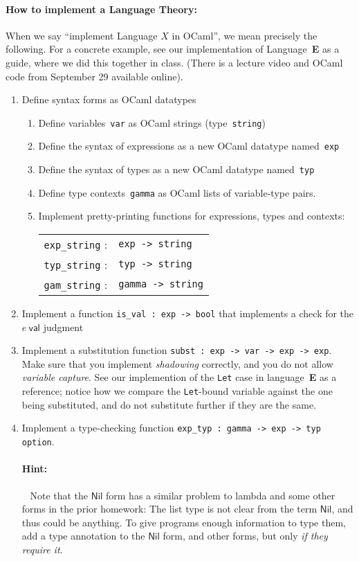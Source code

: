\documentclass[11pt]{article}
\newcommand{\E}{\textbf{\textsf{E}}\xspace}
\newcommand{\Nil}[0]{\textsf{Nil}}
\begin{document}
\paragraph{How to implement a Language Theory:}
When we say ``implement Language $X$ in OCaml'', we mean precisely the
following.  For a concrete example, see our implementation of
Language~\E as a guide, where we did this together in class.  (There
is a lecture video and OCaml code from September 29 available online).
\begin{enumerate}
\item Define syntax forms as OCaml datatypes 
\begin{enumerate}
\item Define variables~\texttt{var} as OCaml strings (type~\texttt{string})
\item Define the syntax of expressions as a new OCaml datatype named~\texttt{exp}
\item Define the syntax of types as a new OCaml datatype named~\texttt{typ}
\item Define type contexts~\texttt{gamma} as OCaml lists of variable-type pairs.
\item Implement pretty-printing functions for expressions, types and contexts:\\ 
\begin{tabular}{ll}
\texttt{exp\_string} :& \texttt{exp -> string}
\\
\texttt{typ\_string} :& \texttt{typ -> string}
\\
\texttt{gam\_string} :& \texttt{gamma -> string}
\end{tabular}
\end{enumerate}
\item Implement a function \texttt{is\_val : exp -> bool} that implements a check for the $e~\textsf{val}$ judgment
\item Implement a substitution function \texttt{subst : exp -> var -> exp -> exp}.  
{
Make sure that you implement \emph{shadowing} correctly, and you do
not allow \emph{variable capture}.  
%
See our implemention of the \texttt{Let} case in language~\E
as a reference; notice how we compare the \texttt{Let}-bound variable
against the one being substituted, and do not substitute further if
they are the same.  }
\item Implement a type-checking function \texttt{exp\_typ : gamma ->
  exp -> typ option}.  

  \paragraph{Hint:}~
  Note that the $\Nil$ form has a similar problem to lambda and some
  other forms in the prior homework: The list type is not clear from
  the term $\Nil$, and thus could be anything.
  To give programs enough information to type them, add a type
  annotation to the $\Nil$ form, and other forms, but only \emph{if they
    require it}. 


\end{enumerate}
\end{document}
